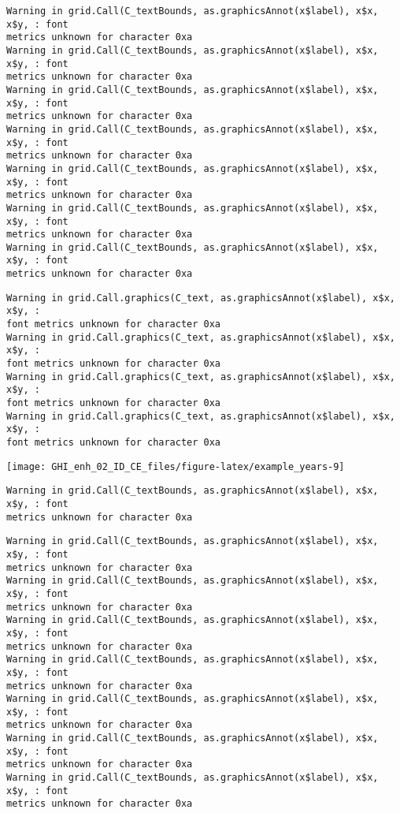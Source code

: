 \documentclass[
  10pt,
  a4paper,oneside]{article}
\begin{document}
\begin{verbatim}
Warning in grid.Call(C_textBounds, as.graphicsAnnot(x$label), x$x, x$y, : font
metrics unknown for character 0xa
Warning in grid.Call(C_textBounds, as.graphicsAnnot(x$label), x$x, x$y, : font
metrics unknown for character 0xa
Warning in grid.Call(C_textBounds, as.graphicsAnnot(x$label), x$x, x$y, : font
metrics unknown for character 0xa
Warning in grid.Call(C_textBounds, as.graphicsAnnot(x$label), x$x, x$y, : font
metrics unknown for character 0xa
Warning in grid.Call(C_textBounds, as.graphicsAnnot(x$label), x$x, x$y, : font
metrics unknown for character 0xa
Warning in grid.Call(C_textBounds, as.graphicsAnnot(x$label), x$x, x$y, : font
metrics unknown for character 0xa
Warning in grid.Call(C_textBounds, as.graphicsAnnot(x$label), x$x, x$y, : font
metrics unknown for character 0xa
\end{verbatim}

\begin{verbatim}
Warning in grid.Call.graphics(C_text, as.graphicsAnnot(x$label), x$x, x$y, :
font metrics unknown for character 0xa
Warning in grid.Call.graphics(C_text, as.graphicsAnnot(x$label), x$x, x$y, :
font metrics unknown for character 0xa
Warning in grid.Call.graphics(C_text, as.graphicsAnnot(x$label), x$x, x$y, :
font metrics unknown for character 0xa
Warning in grid.Call.graphics(C_text, as.graphicsAnnot(x$label), x$x, x$y, :
font metrics unknown for character 0xa
\end{verbatim}

\begin{center}\texttt{[image: GHI\_enh\_02\_ID\_CE\_files/figure-latex/example\_years-9]} \end{center}

\begin{verbatim}
Warning in grid.Call(C_textBounds, as.graphicsAnnot(x$label), x$x, x$y, : font
metrics unknown for character 0xa
\end{verbatim}

\begin{verbatim}
Warning in grid.Call(C_textBounds, as.graphicsAnnot(x$label), x$x, x$y, : font
metrics unknown for character 0xa
Warning in grid.Call(C_textBounds, as.graphicsAnnot(x$label), x$x, x$y, : font
metrics unknown for character 0xa
Warning in grid.Call(C_textBounds, as.graphicsAnnot(x$label), x$x, x$y, : font
metrics unknown for character 0xa
Warning in grid.Call(C_textBounds, as.graphicsAnnot(x$label), x$x, x$y, : font
metrics unknown for character 0xa
Warning in grid.Call(C_textBounds, as.graphicsAnnot(x$label), x$x, x$y, : font
metrics unknown for character 0xa
Warning in grid.Call(C_textBounds, as.graphicsAnnot(x$label), x$x, x$y, : font
metrics unknown for character 0xa
Warning in grid.Call(C_textBounds, as.graphicsAnnot(x$label), x$x, x$y, : font
metrics unknown for character 0xa
\end{verbatim}
\end{document}
